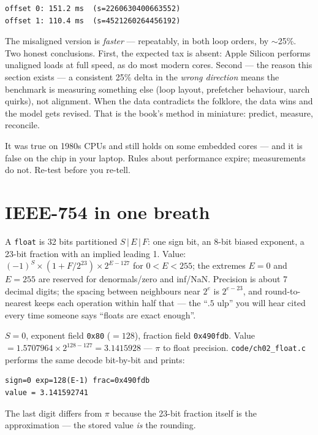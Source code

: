 \begin{lstlisting}[basicstyle=\ttfamily\scriptsize]
offset 0: 151.2 ms  (s=2260630400663552)
offset 1: 110.4 ms  (s=4521260264456192)
\end{lstlisting}

The misaligned version is \emph{faster} --- repeatably, in both loop
orders, by $\sim$25\%. Two honest conclusions. First, the expected tax
is absent: Apple Silicon performs unaligned loads at full speed, as do
most modern cores. Second --- the reason this section exists --- a
consistent 25\% delta in the \emph{wrong direction} means the benchmark
is measuring something else (loop layout, prefetcher behaviour, uarch
quirks), not alignment. When the data contradicts the folklore, the
data wins and the model gets revised. That is the book's method in
miniature: predict, measure, reconcile.

\begin{tripwire}
It was true on 1980s CPUs and still holds on some embedded cores ---
and it is false on the chip in your laptop. Rules about performance
expire; measurements do not. Re-test before you re-tell.
\end{tripwire}

\section{IEEE-754 in one breath}
\label{sec:float02}

A \texttt{float} is 32 bits partitioned $S\,|\,E\,|\,F$: one sign bit,
an 8-bit biased exponent, a 23-bit fraction with an implied leading 1.
Value: $(-1)^S \times (1 + F/2^{23}) \times 2^{E-127}$ for
$0 < E < 255$; the extremes $E{=}0$ and $E{=}255$ are reserved for
denormals/zero and inf/NaN. Precision is about 7 decimal digits; the
spacing between neighbours near $2^e$ is $2^{e-23}$, and round-to-nearest
keeps each operation within half that --- the ``$.5$ ulp'' you will hear
cited every time someone says ``floats are exact enough''.

\begin{example}
\label{ex:float02}
$S{=}0$, exponent field \texttt{0x80} ($=128$),
fraction field \texttt{0x490fdb}. Value
$= 1.5707964 \times 2^{128-127} = 3.1415928$ --- $\pi$ to float
precision. \texttt{code/ch02\_float.c} performs the same decode
bit-by-bit and prints:

\begin{lstlisting}[basicstyle=\ttfamily\scriptsize]
sign=0 exp=128(E-1) frac=0x490fdb
value = 3.141592741
\end{lstlisting}

The last digit differs from $\pi$ because the 23-bit fraction itself is
the approximation --- the stored value \emph{is} the rounding.
\end{example}

